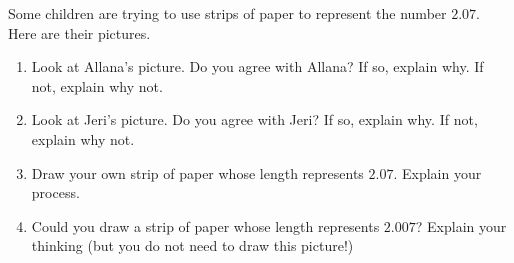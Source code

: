 \documentclass{ximera}
\begin{document}
\newpage

\begin{problem}
Some children are trying to use strips of paper to represent the number $2.07$.  Here are their pictures.
\begin{center}
\end{center}


\begin{enumerate} 
\item Look at Allana's picture. Do you agree with Allana?  If so, explain why.  If not, explain why not.
\item Look at Jeri's picture. Do you agree with Jeri?  If so, explain why.  If not, explain why not.
\item Draw your own strip of paper whose length represents $2.07$. Explain your process.
\item Could you draw a strip of paper whose length represents $2.007$? Explain your thinking (but you do not need to draw this picture!)
\end{enumerate}
\end{problem}


\newpage
\end{document}
